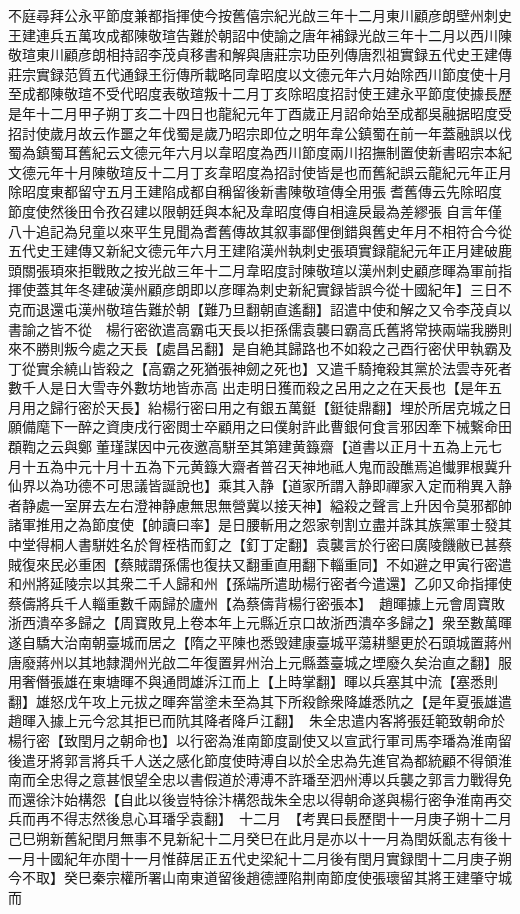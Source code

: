 不庭尋拜公永平節度兼都指揮使今按舊僖宗紀光啟三年十二月東川顧彦朗壁州刺史王建連兵五萬攻成都陳敬瑄告難於朝詔中使諭之唐年補録光啟三年十二月以西川陳敬瑄東川顧彦朗相持詔李茂貞移書和解與唐莊宗功臣列傳唐烈祖實録五代史王建傳莊宗實録范質五代通録王衍傳所載略同韋昭度以文德元年六月始除西川節度使十月至成都陳敬瑄不受代昭度表敬瑄叛十二月丁亥除昭度招討使王建永平節度使據長歷是年十二月甲子朔丁亥二十四日也龍紀元年丁酉歲正月詔命始至成都吳融据昭度受招討使歲月故云作噩之年伐蜀是歲乃昭宗即位之明年韋公鎮蜀在前一年蓋融誤以伐蜀為鎮蜀耳舊紀云文德元年六月以韋昭度為西川節度兩川招撫制置使新書昭宗本紀文德元年十月陳敬瑄反十二月丁亥韋昭度為招討使皆是也而舊紀誤云龍紀元年正月除昭度東都留守五月王建陷成都自稱留後新書陳敬瑄傳全用張耆舊傳云先除昭度節度使然後田令孜召建以限朝廷與本紀及韋昭度傳自相違戾最為差繆張自言年僅八十追記為兒童以來平生見聞為耆舊傳故其叙事鄙俚倒錯與舊史年月不相符合今從五代史王建傳又新紀文德元年六月王建陷漢州執刺史張頊實録龍紀元年正月建破鹿頭關張頊來拒戰敗之按光啟三年十二月韋昭度討陳敬瑄以漢州刺史顧彦暉為軍前指揮使蓋其年冬建破漢州顧彦朗即以彦暉為刺史新紀實録皆誤今從十國紀年】三日不克而退還屯漢州敬瑄告難於朝【難乃旦翻朝直遙翻】詔遣中使和解之又令李茂貞以書諭之皆不從　楊行密欲遣高霸屯天長以拒孫儒袁襲曰霸高氏舊將常挾兩端我勝則來不勝則叛今處之天長【處昌呂翻】是自絶其歸路也不如殺之己酉行密伏甲執霸及丁從實余繞山皆殺之【高霸之死猶張神劒之死也】又遣千騎掩殺其黨於法雲寺死者數千人是日大雪寺外數坊地皆赤高出走明日獲而殺之呂用之之在天長也【是年五月用之歸行密於天長】紿楊行密曰用之有銀五萬鋌【鋌徒鼎翻】埋於所居克城之日願備麾下一醉之資庚戌行密閲士卒顧用之曰僕射許此曹銀何食言邪因牽下械繋命田頵鞫之云與鄭董瑾謀因中元夜邀高駢至其第建黄籙齋【道書以正月十五為上元七月十五為中元十月十五為下元黄籙大齋者普召天神地祗人鬼而設醮焉追懴罪根冀升仙界以為功德不可思議皆誕說也】乘其入静【道家所謂入静即禪家入定而稍異入静者静處一室屏去左右澄神静慮無思無營冀以接天神】縊殺之聲言上升因令莫邪都帥諸軍推用之為節度使【帥讀曰率】是日腰斬用之怨家刳割立盡并誅其族黨軍士發其中堂得桐人書駢姓名於胷桎梏而釘之【釘丁定翻】袁襲言於行密曰廣陵饑敝已甚蔡賊復來民必重困【蔡賊謂孫儒也復扶又翻重直用翻下輜重同】不如避之甲寅行密遣和州將延陵宗以其衆二千人歸和州【孫端所遣助楊行密者今遣還】乙卯又命指揮使蔡儔將兵千人輜重數千兩歸於廬州【為蔡儔背楊行密張本】　趙暉據上元會周寶敗浙西潰卒多歸之【周寶敗見上卷本年上元縣近京口故浙西潰卒多歸之】衆至數萬暉遂自驕大治南朝臺城而居之【隋之平陳也悉毁建康臺城平蕩耕墾更於石頭城置蔣州唐廢蔣州以其地隸潤州光啟二年復置昇州治上元縣蓋臺城之堙廢久矣治直之翻】服用奢僭張雄在東塘暉不與通問雄泝江而上【上時掌翻】暉以兵塞其中流【塞悉則翻】雄怒戊午攻上元拔之暉奔當塗未至為其下所殺餘衆降雄悉阬之【是年夏張雄遣趙暉入據上元今忿其拒已而阬其降者降戶江翻】　朱全忠遣内客將張廷範致朝命於楊行密【致閏月之朝命也】以行密為淮南節度副使又以宣武行軍司馬李璠為淮南留後遣牙將郭言將兵千人送之感化節度使時溥自以於全忠為先進官為都統顧不得領淮南而全忠得之意甚恨望全忠以書假道於溥溥不許璠至泗州溥以兵襲之郭言力戰得免而還徐汴始構怨【自此以後豈特徐汴構怨哉朱全忠以得朝命遂與楊行密争淮南再交兵而再不得志然後息心耳璠孚袁翻】　十二月　【考異曰長歷閏十一月庚子朔十二月己巳朔新舊紀閏月無事不見新紀十二月癸巳在此月是亦以十一月為閏妖亂志有後十一月十國紀年亦閏十一月惟薛居正五代史梁紀十二月後有閏月實録閏十二月庚子朔今不取】癸巳秦宗權所署山南東道留後趙德諲陷荆南節度使張瓌留其將王建肇守城而